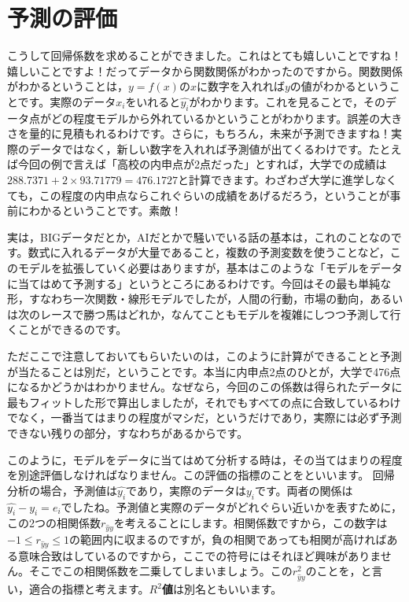 \documentclass{ltjbook}
\begin{document}
\section{予測の評価}
こうして回帰係数を求めることができました。これはとても嬉しいことですね！嬉しいことですよ！だってデータから関数関係がわかったのですから。関数関係がわかるということは，$y=f(x)$の$x$に数字を入れれば$y$の値がわかるということです。実際のデータ$x_i$をいれると$\hat{y_i}$がわかります。これを見ることで，そのデータ点がどの程度モデルから外れているかということがわかります。誤差の大きさを量的に見積もれるわけです。さらに，もちろん，未来が予測できますね！実際のデータではなく，新しい数字を入れれば予測値が出てくるわけです。たとえば今回の例で言えば「高校の内申点が2点だった」とすれば，大学での成績は$288.7371+2\times93.71779=476.1727$と計算できます。わざわざ大学に進学しなくても，この程度の内申点ならこれぐらいの成績をあげるだろう，ということが事前にわかるということです。素敵！

実は，BIGデータだとか，AIだとかで騒いでいる話の基本は，これのことなのです。数式に入れるデータが大量であること，複数の予測変数を使うことなど，このモデルを拡張していく必要はありますが，基本はこのような「モデルをデータに当てはめて予測する」というところにあるわけです。今回はその最も単純な形，すなわち一次関数・線形モデルでしたが，人間の行動，市場の動向，あるいは次のレースで勝つ馬はどれか，なんてこともモデルを複雑にしつつ予測して行くことができるのです。

ただここで注意しておいてもらいたいのは，このように計算ができることと予測が当たることは別だ，ということです。本当に内申点2点のひとが，大学で476点になるかどうかはわかりません。なぜなら，今回のこの係数は得られたデータに最もフィットした形で算出しましたが，それでもすべての点に合致しているわけでなく，一番当てはまりの程度がマシだ，というだけであり，実際には必ず予測できない残りの部分，すなわちがあるからです。

このように，モデルをデータに当てはめて分析する時は，その当てはまりの程度を別途評価しなければなりません。この評価の指標のことをといいます。
回帰分析の場合，予測値は$\hat{y_i}$であり，実際のデータは$y_i$です。両者の関係は$\hat{y_i}-y_i=e_i$でしたね。予測値と実際のデータがどれぐらい近いかを表すために，この2つの相関係数$r_{\hat{y}y}$を考えることにします。相関係数ですから，この数字は$-1\le r_{\hat{y}y} \le 1$の範囲内に収まるのですが，負の相関であっても相関が高ければある意味合致はしているのですから，ここでの符号にはそれほど興味がありません。そこでこの相関係数を二乗してしまいましょう。この$r_{\hat{y}y}^2$のことを，と言い，適合の指標と考えます。\textbf{$R^2$値}は別名ともいいます。
\end{document}
